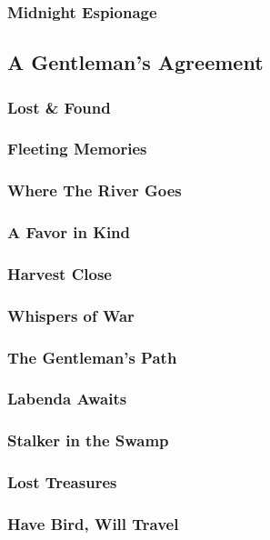         \subsubsection{Midnight Espionage}
        
    \newpage
    \subsection{A Gentleman's Agreement} \vspace*{\fill}
    \newpage 
        \subsubsection{Lost \& Found}
        \subsubsection{Fleeting Memories}
        \subsubsection{Where The River Goes}
        \subsubsection{A Favor in Kind}
        \subsubsection{Harvest Close}
        \subsubsection{Whispers of War}
        \subsubsection{The Gentleman's Path}
        \subsubsection{Labenda Awaits}
        \subsubsection{Stalker in the Swamp}
        \subsubsection{Lost Treasures}
        \subsubsection{Have Bird, Will Travel}
